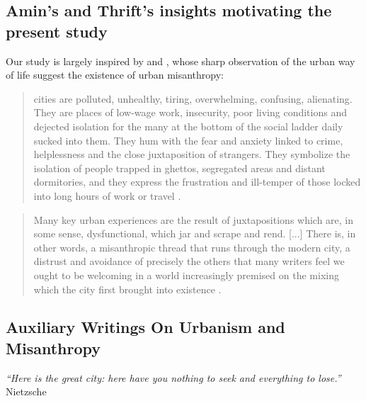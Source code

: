 \documentclass[11pt, letterpaper]{article}
\begin{document}
\begin{spacing}{1.4}
\subsection{Amin's and Thrift's insights motivating the present study}

Our study is largely inspired by \citet{amin06} and \citet{thrift05}, whose sharp observation of
the urban way of life suggest the existence of urban misanthropy: 

\begin{quote}
  cities are polluted,
  unhealthy, tiring, overwhelming, confusing, alienating. They are places of
  low-wage work, insecurity, poor living conditions and dejected isolation for
  the many at the bottom of the social ladder daily sucked into them. They hum
  with the fear and anxiety linked to crime, helplessness and the close
  juxtaposition of strangers. They symbolize the isolation of people trapped in
  ghettos, segregated areas and distant dormitories, and they express the
  frustration and ill-temper of those locked into long hours of work or travel \citep[][p. 1011]{amin06}.
\end{quote}
\begin{quote}
 Many key urban experiences are the result of
juxtapositions which are, in some sense, dysfunctional, which jar and scrape and
rend. [...]  %
There is, in other words, a {misanthropic} thread that runs through
the modern city, a distrust and avoidance of precisely the others that many writers feel we ought to be
welcoming in a world increasingly premised on the mixing which the city first
brought into existence \citep[][p. 140]{thrift05}.
\end{quote}


\subsection{Auxiliary Writings On Urbanism and Misanthropy}

{\small\it \noindent ``Here is the great city: here have you nothing to seek and
  everything to lose.''} Nietzsche\\


\end{spacing}
\end{document}
